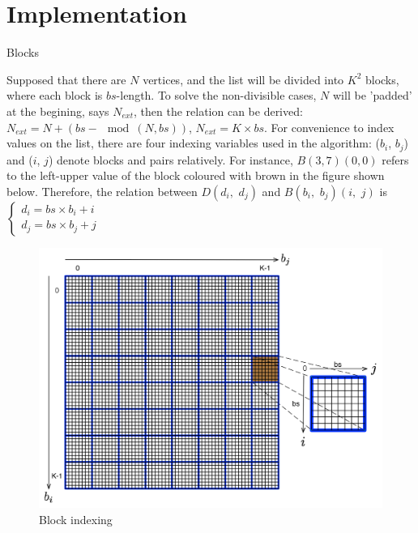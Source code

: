 \documentclass[12pt]{article}
\makeatletter
\renewenvironment{itemize}
{\list{$\bullet$}{\leftmargin\z@ \labelwidth\z@ \itemindent-\leftmargin
\let\makelabel\descriptionlabel}}
{\endlist}
\makeatother
\begin{document}
\newpage

\section*{Implementation}
\vspace{-20pt}
\noindent\makebox[\linewidth]{\rule{\textwidth}{0.4pt}}

\begin{itemize}
    \item Blocks
    \begin{flushleft}
        Supposed that there are $N$ vertices, and the list will be divided into $K^2$ blocks, where each block is $bs$-length. To solve the non-divisible cases, $N$ will be 'padded' at the begining, says $N_{ext}$, then the relation can be derived: $N_{ext} = N + (bs - \mod(N, bs))$, $N_{ext} = K \times bs$. For convenience to index values on the list, there are four indexing variables used in the algorithm: ($b_i$, $b_j$) and ($i$, $j$) denote blocks and pairs relatively. For instance, $B(3, 7)(0, 0)$ refers to the left-upper value of the block coloured with brown in the figure shown below. Therefore, the relation between $D(d_i, \,\, d_j)$ and $B(b_i, \,\, b_j)(i, \,\, j)$ is
        $
        \begin{cases}
            d_i = bs \times b_i + i \\
            d_j = bs \times b_j + j
        \end{cases}
        $
    \end{flushleft}
    \begin{figure}[ht]
        \includegraphics[scale=.4]{./block_indexing.png}
        \caption{Block indexing}
    \end{figure}


\end{itemize}
\end{document}
